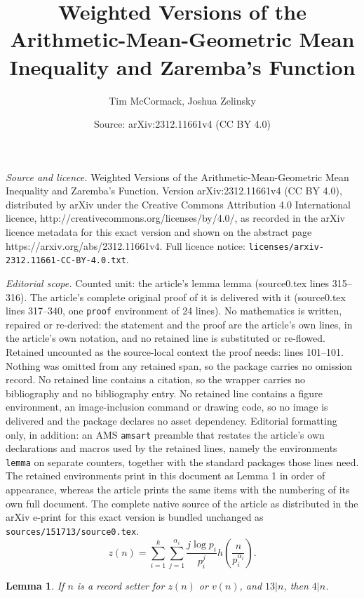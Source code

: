 \documentclass[10pt,a4paper]{amsart}
\title{Weighted Versions of the Arithmetic-Mean-Geometric Mean Inequality and Zaremba's Function}
\author{Tim McCormack, Joshua Zelinsky}
\date{Source: arXiv:2312.11661v4 (CC BY 4.0)}
\newtheorem{lemma}{Lemma}
\begin{document}
\maketitle

\noindent\emph{Source and licence.} Weighted Versions of the Arithmetic-Mean-Geometric Mean Inequality and Zaremba's Function. Version arXiv:2312.11661v4 (CC BY 4.0), distributed by arXiv under the Creative Commons Attribution 4.0 International licence, http://creativecommons.org/licenses/by/4.0/, as recorded in the arXiv licence metadata for this exact version and shown on the abstract page https://arxiv.org/abs/2312.11661v4. Full licence notice: \texttt{licenses/arxiv-2312.11661-CC-BY-4.0.txt}.\par\smallskip

\noindent\textit{Editorial scope.} Counted unit: the article's lemma lemma (source0.tex lines 315--316). The article's complete original proof of it is delivered with it (source0.tex lines 317--340, one \texttt{proof} environment of 24 lines). No mathematics is written, repaired or re-derived: the statement and the proof are the article's own lines, in the article's own notation, and no retained line is substituted or re-flowed.  Retained uncounted as the source-local context the proof needs: lines 101--101.  Nothing was omitted from any retained span, so the package carries no omission record.  No retained line contains a citation, so the wrapper carries no bibliography and no bibliography entry.  No retained line contains a figure environment, an image-inclusion command or drawing code, so no image is delivered and the package declares no asset dependency.  Editorial formatting only, in addition: an AMS \texttt{amsart} preamble that restates the article's own declarations and macros used by the retained lines, namely the environments \texttt{lemma} on separate counters, together with the standard packages those lines need.  The retained environments print in this document as Lemma 1 in order of appearance, whereas the article prints the same items with the numbering of its own full document.  The complete native source of the article as distributed in the arXiv e-print for this exact version is bundled unchanged as \texttt{sources/151713/source0.tex}.
\begin{equation}\label{Erdos-Zaremba rearrangement} z(n) = \sum_{i=1}^k \sum_{j=1}^{\alpha_i} \frac{j \log p_i}{p_i^j}h\left(\frac{n}{p_i^{\alpha_i}}\right). \end{equation} 

\begin{lemma} If $n$ is a record setter for $z(n)$ or $v(n)$, and $13|n$, then $4|n$.
\end{lemma}
\end{document}
